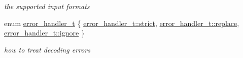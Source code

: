 \begin{DoxyCompactItemize}
\begin{DoxyCompactList}\small\item\em the supported input formats \end{DoxyCompactList}\item 
enum \mbox{\hyperlink{namespacenlohmann_1_1detail_a5a76b60b26dc8c47256a996d18d967df}{error\+\_\+handler\+\_\+t}} \{ \mbox{\hyperlink{namespacenlohmann_1_1detail_a5a76b60b26dc8c47256a996d18d967dfa2133fd717402a7966ee88d06f9e0b792}{error\+\_\+handler\+\_\+t\+::strict}}, 
\mbox{\hyperlink{namespacenlohmann_1_1detail_a5a76b60b26dc8c47256a996d18d967dfa9dde360102c103867bd2f45872f1129c}{error\+\_\+handler\+\_\+t\+::replace}}, 
\mbox{\hyperlink{namespacenlohmann_1_1detail_a5a76b60b26dc8c47256a996d18d967dfa567bc1d268f135496de3d5b946b691f3}{error\+\_\+handler\+\_\+t\+::ignore}}
 \}
\begin{DoxyCompactList}\small\item\em how to treat decoding errors \end{DoxyCompactList}\end{DoxyCompactItemize}
